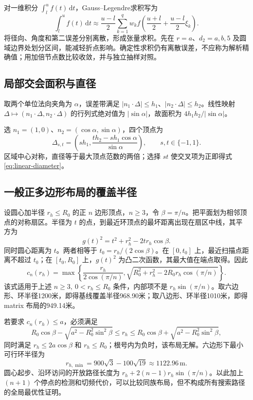 对一维积分 $\int_l^u f(t)\,\mathrm dt$，Gauss--Legendre求积写为
\begin{equation}
\int_l^u f(t)\,\mathrm dt\approx\frac{u-l}{2}\sum_{k=1}^q w_k
f\left(\frac{u+l}{2}+\frac{u-l}{2}\xi_k\right).
\end{equation}
将径向、角度和第二误差分别离散，形成张量求积。先在 $r=a$、$d_2=a,b,5$ 及圆域边界处划分区间，能减轻折点影响。确定性求积仍有离散误差，不应称为解析精确值；用加倍节点数比较收敛，并与独立抽样对照。

\subsection{局部交会面积与直径}
取两个单位法向夹角为 $\alpha$，误差带满足 $|n_1\cdot\Delta|\le h_1$、$|n_2\cdot\Delta|\le h_2$。线性映射 $\Delta\mapsto(n_1\cdot\Delta,n_2\cdot\Delta)$ 的行列式绝对值为 $|\sin\alpha|$，故面积为 $4h_1h_2/|\sin\alpha|$。

选 $n_1=(1,0)$、$n_2=(\cos\alpha,\sin\alpha)$，四个顶点为
\begin{equation}
\Delta_{s,t}=\left(s h_1,\frac{t h_2-s h_1\cos\alpha}{\sin\alpha}\right),\qquad s,t\in\{-1,1\}.
\end{equation}
区域中心对称，直径等于最大顶点范数的两倍；选择 $st$ 使交叉项为正即得式\eqref{eq:linear-diameter}。

\subsection{一般正多边形布局的覆盖半径}
设圆心加半径 $r_h\le R_0$ 的正 $n$ 边形顶点，$n\ge3$，令 $\beta=\pi/n$。把平面划为相邻顶点的对称扇区。半径为 $t$ 的点，到最近环顶点的最坏距离出现在扇区中线，其平方为
\begin{equation}
g(t)^2=t^2+r_h^2-2tr_h\cos\beta.
\end{equation}
同时圆心距离为 $t$。两者相等于 $t_0=r_h/(2\cos\beta)$。在 $[0,t_0]$ 上，最近扫描点距离不超过 $t_0$；在 $[t_0,R_0]$ 上，$g(t)^2$ 为凸二次函数，其最大值在端点取得。因此
\begin{equation}
\boxed{c_n(r_h)=\max\left\{\frac{r_h}{2\cos(\pi/n)},
\sqrt{R_0^2+r_h^2-2R_0r_h\cos(\pi/n)}\right\}.}
\label{eq:generalcover}
\end{equation}
该式适用于上述 $n\ge3,\ 0<r_h\le R_0$ 条件，内部项不是 $r_h\sin(\pi/n)$。取六边形、环半径1200米，即得基线覆盖半径968.90米；取八边形、环半径1010米，即得 matrix 布局的949.14米。

若要求 $c_n(r_h)\le a$，必须满足
\begin{equation}
R_0\cos\beta-\sqrt{a^2-R_0^2\sin^2\beta}\le r_h
\le R_0\cos\beta+\sqrt{a^2-R_0^2\sin^2\beta},
\end{equation}
同时满足 $r_h\le2a\cos\beta$ 和 $r_h\le R_0$；根号内为负时，该布局无解。六边形下最小可行环半径为
\begin{equation}
r_{h,\min}=900\sqrt3-100\sqrt{19}\approx1122.96\,\mathrm m.
\end{equation}
圆心起步、沿环访问的开放路径长度为 $r_h+2(n-1)r_h\sin(\pi/n)$。以此加上 $(n+1)$ 个停点的检测和切频代价，可以比较同族布局，但不构成所有搜索路径的全局最优性证明。

